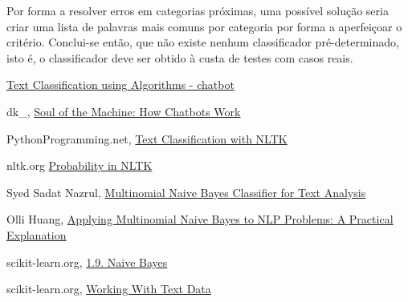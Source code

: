 \documentclass[12pt]{article}
\begin{document}
Por forma a resolver erros em categorias próximas, uma possível solução seria criar uma lista de palavras
mais comuns por categoria por forma a aperfeiçoar o critério.
Conclui-se então, que não existe nenhum classificador pré-determinado, isto é, o classificador deve ser obtido
à custa de testes com casos reais.


\begin{thebibliography}{9}

      \href{https://chatbotslife.com/text-classification-using-algorithms-e4d50dcba45}{Text Classification using Algorithms - chatbot}
    
    dk\_,
    \href{https://medium.com/@gk_/how-chat-bots-work-dfff656a35e2}{Soul of the Machine: How Chatbots Work}

    PythonProgramming.net,
    \href{https://pythonprogramming.net/text-classification-nltk-tutorial/}{Text Classification with NLTK}

    nltk.org
    \href{http://www.nltk.org/howto/probability.html}{Probability in NLTK}

    Syed Sadat Nazrul,
    \href{https://towardsdatascience.com/multinomial-naive-bayes-classifier-for-text-analysis-python-8dd6825ece67}{Multinomial Naive Bayes Classifier for Text Analysis}
    
    Olli Huang,
    \href{https://syncedreview.com/2017/07/17/applying-multinomial-naive-bayes-to-nlp-problems-a-practical-explanation/}{Applying Multinomial Naive Bayes to NLP Problems: A Practical Explanation}

    scikit-learn.org,
    \href{http://scikit-learn.org/stable/modules/naive_bayes.html}{1.9. Naive Bayes}

    scikit-learn.org,
    \href{http://scikit-learn.org/stable/tutorial/text_analytics/working_with_text_data.html}{Working With Text Data}

    \end{thebibliography}
\end{document}
